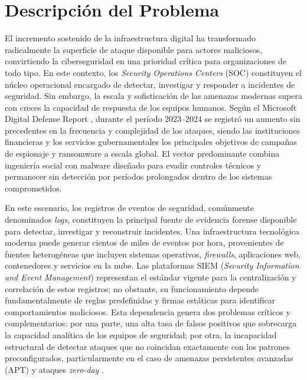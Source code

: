 \chapter{Descripción del Problema}

El incremento sostenido de la infraestructura digital ha transformado radicalmente la superficie de ataque disponible para actores maliciosos, convirtiendo la ciberseguridad en una prioridad crítica para organizaciones de todo tipo. En este contexto, los \textit{Security Operations Centers} (SOC) constituyen el núcleo operacional encargado de detectar, investigar y responder a incidentes de seguridad. Sin embargo, la escala y sofisticación de las amenazas modernas supera con creces la capacidad de respuesta de los equipos humanos. Según el Microsoft Digital Defense Report \cite{MS-data}, durante el período 2023--2024 se registró un aumento sin precedentes en la frecuencia y complejidad de los ataques, siendo las instituciones financieras y los servicios gubernamentales los principales objetivos de campañas de espionaje y ransomware a escala global. El vector predominante combina ingeniería social con malware diseñado para evadir controles técnicos y permanecer sin detección por períodos prolongados dentro de los sistemas comprometidos.

En este escenario, los registros de eventos de seguridad, comúnmente denominados \textit{logs}, constituyen la principal fuente de evidencia forense disponible para detectar, investigar y reconstruir incidentes. Una infraestructura tecnológica moderna puede generar cientos de miles de eventos por hora, provenientes de fuentes heterogéneas que incluyen sistemas operativos, \textit{firewalls}, aplicaciones web, contenedores y servicios en la nube. Las plataformas SIEM (\textit{Security Information and Event Management}) representan el estándar vigente para la centralización y correlación de estos registros; no obstante, su funcionamiento depende fundamentalmente de reglas predefinidas y firmas estáticas para identificar comportamientos maliciosos. Esta dependencia genera dos problemas críticos y complementarios: por una parte, una alta tasa de falsos positivos que sobrecarga la capacidad analítica de los equipos de seguridad; por otra, la incapacidad estructural de detectar ataques que no coincidan exactamente con los patrones preconfigurados, particularmente en el caso de amenazas persistentes avanzadas (APT) y ataques \textit{zero-day} \cite{blefari2026cyberrag}.

